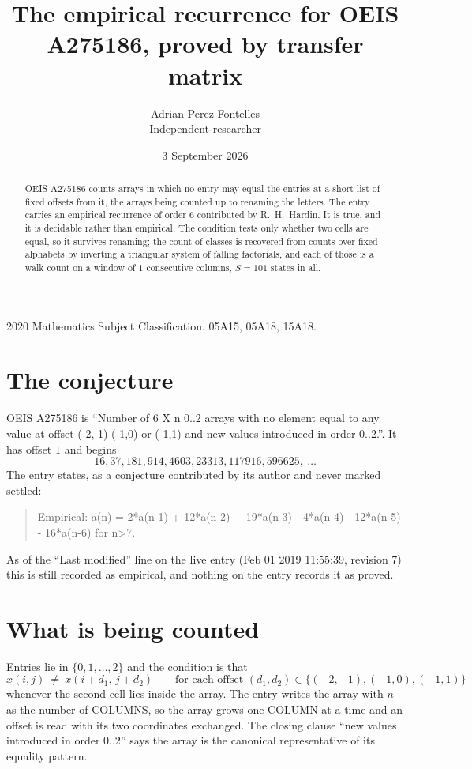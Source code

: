 \documentclass[11pt,a4paper]{article}
\title{The empirical recurrence for OEIS A275186, proved by transfer matrix}
\author{Adrian Perez Fontelles\\ \small Independent researcher}
\date{3 September 2026}
\theoremstyle{plain}
\theoremstyle{definition}
\begin{document}
\maketitle

\begin{abstract}
OEIS A275186 counts arrays in which no entry may equal the entries at a short list of fixed offsets
from it, the arrays being counted up to renaming the letters. The entry carries an empirical
recurrence of order $6$ contributed by R.~H.~Hardin. It is true, and it is decidable
rather than empirical. The condition tests only whether two cells are equal, so it survives
renaming; the count of classes is recovered from counts over fixed alphabets by inverting a
triangular system of falling factorials, and each of those is a walk count on a window of
$1$ consecutive columns, $S=101$ states in all.
\end{abstract}

\noindent\small 2020 Mathematics Subject Classification. 05A15, 05A18, 15A18.\normalsize

\section{The conjecture}

OEIS A275186 is ``Number of 6 X n 0..2 arrays with no element equal to any value at offset (-2,-1) (-1,0) or (-1,1) and new values introduced in order 0..2.''. It has offset $1$ and begins
\[
16, 37, 181, 914, 4603, 23313, 117916, 596625,\ \dots
\]
The entry states, as a conjecture contributed by its author and never marked settled:
\begin{quote}
Empirical: a(n) = 2*a(n-1) + 12*a(n-2) + 19*a(n-3) - 4*a(n-4) - 12*a(n-5) - 16*a(n-6) for n>7.
\end{quote}
As of the ``Last modified'' line on the live entry (Feb 01 2019 11:55:39, revision 7) this is still
recorded as empirical, and nothing on the entry records it as proved.

\section{What is being counted}

Entries lie in $\{0,1,\dots,2\}$ and the condition is that
\[
x(i,j)\ \ne\ x(i+d_1,\,j+d_2)\qquad\text{for each offset }(d_1,d_2)\in\{(-2,-1), (-1,0), (-1,1)\}
\]
whenever the second cell lies inside the array. The entry writes the array with $n$ as the number of COLUMNS, so the array grows one COLUMN at a time and an offset is read with its two coordinates exchanged. The closing clause ``new values
introduced in order $0..2$'' says the array is the canonical representative of its equality
pattern.
\end{document}
